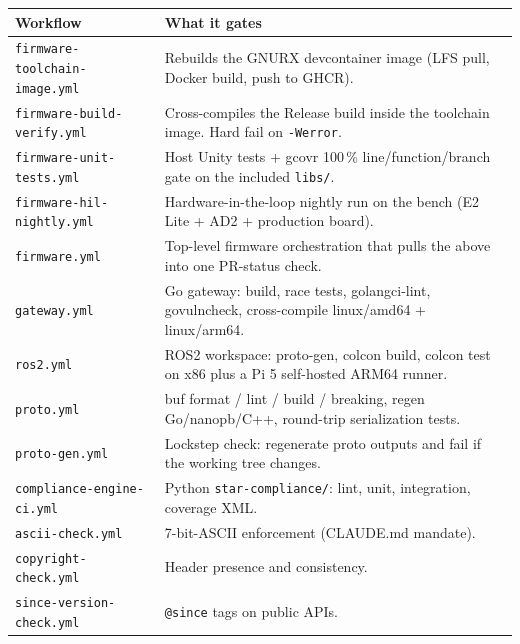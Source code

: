 \begin{center}
\begin{tabular}{|p{5.0cm}|p{9.5cm}|}
\hline
\textbf{Workflow}                          & \textbf{What it gates}                                                                                                          \\
\hline
\texttt{firmware-toolchain-image.yml}      & Rebuilds the GNURX devcontainer image (LFS pull, Docker build, push to GHCR).                                                   \\
\texttt{firmware-build-verify.yml}         & Cross-compiles the Release build inside the toolchain image. Hard fail on \texttt{-Werror}.                                     \\
\texttt{firmware-unit-tests.yml}           & Host Unity tests + gcovr 100\,\% line/function/branch gate on the included \texttt{libs/}.                                       \\
\texttt{firmware-hil-nightly.yml}          & Hardware-in-the-loop nightly run on the bench (E2 Lite + AD2 + production board).                                              \\
\texttt{firmware.yml}                      & Top-level firmware orchestration that pulls the above into one PR-status check.                                                  \\
\texttt{gateway.yml}                       & Go gateway: build, race tests, golangci-lint, govulncheck, cross-compile linux/amd64 + linux/arm64.                              \\
\texttt{ros2.yml}                          & ROS2 workspace: proto-gen, colcon build, colcon test on x86 plus a Pi 5 self-hosted ARM64 runner.                                \\
\texttt{proto.yml}                         & buf format / lint / build / breaking, regen Go/nanopb/C++, round-trip serialization tests.                                \\
\texttt{proto-gen.yml}                     & Lockstep check: regenerate proto outputs and fail if the working tree changes.                                                  \\
\texttt{compliance-engine-ci.yml}          & Python \texttt{star-compliance/}: lint, unit, integration, coverage XML.                                                        \\
\texttt{ascii-check.yml}                   & 7-bit-ASCII enforcement (CLAUDE.md mandate).                                                                                     \\
\texttt{copyright-check.yml}               & Header presence and consistency.                                                                                                  \\
\texttt{since-version-check.yml}           & \texttt{@since} tags on public APIs.                                                                                              \\
\hline
\end{tabular}
\end{center}

